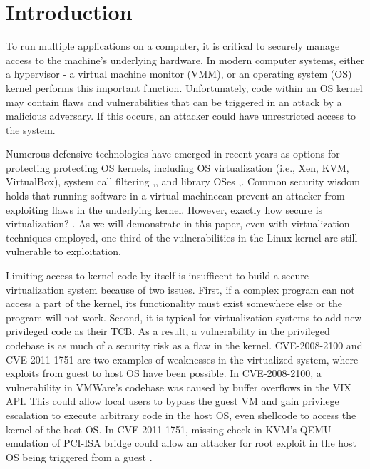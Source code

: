 \section{Introduction}
\label{sec.introduction}

To run multiple applications on a computer, it is critical to securely
manage access to the machine's underlying hardware.
In modern computer systems, either a hypervisor - a virtual machine monitor (VMM), or an
operating system (OS) kernel performs this important function. Unfortunately, code within an OS kernel
may contain flaws and vulnerabilities that can be triggered in an attack by a malicious adversary.
If this occurs, an attacker could have unrestricted access to the system.


Numerous defensive technologies have emerged in recent years as options for protecting
protecting OS kernels, including OS virtualization (i.e., Xen,
 KVM, VirtualBox), system call filtering \cite{Janus:99},\cite{SCI-04},
and library OSes \cite{Bascule},\cite{Drawbridge-11}.
Common security wisdom holds that running software in a
virtual machinecan prevent an attacker from exploiting flaws in the underlying
kernel. However, exactly how secure is virtualization? \cite{Tal}. As we will
demonstrate in this paper, even with virtualization techniques employed, one
third of the vulnerabilities in the Linux kernel are still vulnerable to exploitation.

Limiting access to kernel code by itself is insufficent to build a secure virtualization system because of two issues.
First, if a complex program can not access a part of the kernel, its functionality must exist somewhere else or the program will not work.
Second, it is typical for virtualization systems to add new privileged code as their TCB.
As a result, a vulnerability in the privileged codebase is as much of a security risk as a flaw in the kernel.
CVE-2008-2100 and CVE-2011-1751 are two examples of weaknesses in the virtualized system, where exploits from guest to host OS have been possible.
In CVE-2008-2100, a vulnerability in VMWare's codebase was caused by buffer overflows in the VIX API.
This could allow local users to bypass the guest VM and gain privilege escalation to execute arbitrary code in the host OS,
even shellcode to access the kernel of the host OS. In CVE-2011-1751, missing check in KVM's QEMU emulation of PCI-ISA bridge
could allow an attacker for root exploit in the host OS being triggered from a guest \cite{Virtunoid}.

